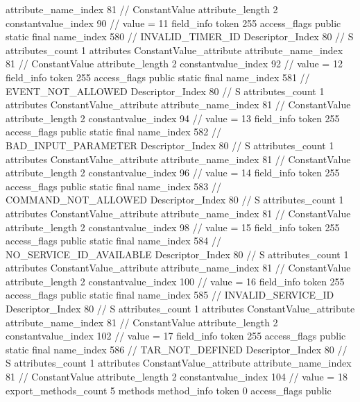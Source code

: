 {{{{{{{					attribute_name_index	81		// ConstantValue
					attribute_length	2
					constantvalue_index	90		// value = 11
				}
				}
			}
			field_info {
				token	255
				access_flags	public static final
				name_index	580		// INVALID_TIMER_ID
				Descriptor_Index	80		// S
				attributes_count	1
				attributes {
				ConstantValue_attribute {
					attribute_name_index	81		// ConstantValue
					attribute_length	2
					constantvalue_index	92		// value = 12
				}
				}
			}
			field_info {
				token	255
				access_flags	public static final
				name_index	581		// EVENT_NOT_ALLOWED
				Descriptor_Index	80		// S
				attributes_count	1
				attributes {
				ConstantValue_attribute {
					attribute_name_index	81		// ConstantValue
					attribute_length	2
					constantvalue_index	94		// value = 13
				}
				}
			}
			field_info {
				token	255
				access_flags	public static final
				name_index	582		// BAD_INPUT_PARAMETER
				Descriptor_Index	80		// S
				attributes_count	1
				attributes {
				ConstantValue_attribute {
					attribute_name_index	81		// ConstantValue
					attribute_length	2
					constantvalue_index	96		// value = 14
				}
				}
			}
			field_info {
				token	255
				access_flags	public static final
				name_index	583		// COMMAND_NOT_ALLOWED
				Descriptor_Index	80		// S
				attributes_count	1
				attributes {
				ConstantValue_attribute {
					attribute_name_index	81		// ConstantValue
					attribute_length	2
					constantvalue_index	98		// value = 15
				}
				}
			}
			field_info {
				token	255
				access_flags	public static final
				name_index	584		// NO_SERVICE_ID_AVAILABLE
				Descriptor_Index	80		// S
				attributes_count	1
				attributes {
				ConstantValue_attribute {
					attribute_name_index	81		// ConstantValue
					attribute_length	2
					constantvalue_index	100		// value = 16
				}
				}
			}
			field_info {
				token	255
				access_flags	public static final
				name_index	585		// INVALID_SERVICE_ID
				Descriptor_Index	80		// S
				attributes_count	1
				attributes {
				ConstantValue_attribute {
					attribute_name_index	81		// ConstantValue
					attribute_length	2
					constantvalue_index	102		// value = 17
				}
				}
			}
			field_info {
				token	255
				access_flags	public static final
				name_index	586		// TAR_NOT_DEFINED
				Descriptor_Index	80		// S
				attributes_count	1
				attributes {
				ConstantValue_attribute {
					attribute_name_index	81		// ConstantValue
					attribute_length	2
					constantvalue_index	104		// value = 18
				}
				}
			}
			}
			export_methods_count	5
			methods {
				method_info {
					token	0
					access_flags	public
}}}}}
